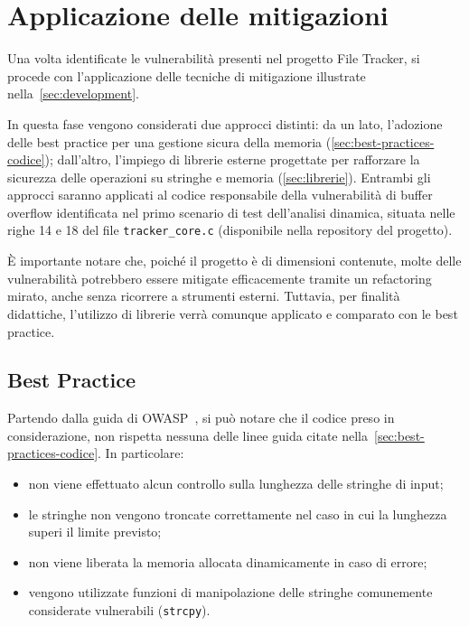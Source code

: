 \section{Applicazione delle mitigazioni}
\label{sec:mitigation_techniques}

Una volta identificate le vulnerabilità presenti nel progetto File Tracker, si
procede con l'applicazione delle tecniche di mitigazione illustrate nella~\autoref{sec:development}.

In questa fase vengono considerati due approcci distinti: da un lato, l'adozione
delle best practice per una gestione sicura della memoria (\autoref{sec:best-practices-codice});
dall'altro, l'impiego di librerie esterne progettate per rafforzare la sicurezza
delle operazioni su stringhe e memoria (\autoref{sec:librerie}). Entrambi gli approcci
saranno applicati al codice responsabile della vulnerabilità di buffer overflow identificata
nel primo scenario di test dell'analisi dinamica, situata nelle righe 14 e 18
del file \texttt{tracker\_core.c} (disponibile nella repository del progetto).

È importante notare che, poiché il progetto è di dimensioni contenute, molte delle
vulnerabilità potrebbero essere mitigate efficacemente tramite un refactoring mirato,
anche senza ricorrere a strumenti esterni. Tuttavia, per finalità didattiche, l'utilizzo
di librerie verrà comunque applicato e comparato con le best practice.

\subsection*{Best Practice}
\label{sec:best-practices-case-study}

Partendo dalla guida di OWASP~\cite{owasp_best_practices}, si può notare che il
codice preso in considerazione, non rispetta nessuna delle linee guida citate nella~\autoref{sec:best-practices-codice}.
In particolare:
\begin{itemize}
  \item non viene effettuato alcun controllo sulla lunghezza delle stringhe di input;

  \item le stringhe non vengono troncate correttamente nel caso in cui la lunghezza
    superi il limite previsto;

  \item non viene liberata la memoria allocata dinamicamente in caso di errore;

  \item vengono utilizzate funzioni di manipolazione delle stringhe comunemente considerate
    vulnerabili (\texttt{strcpy}).
\end{itemize}


